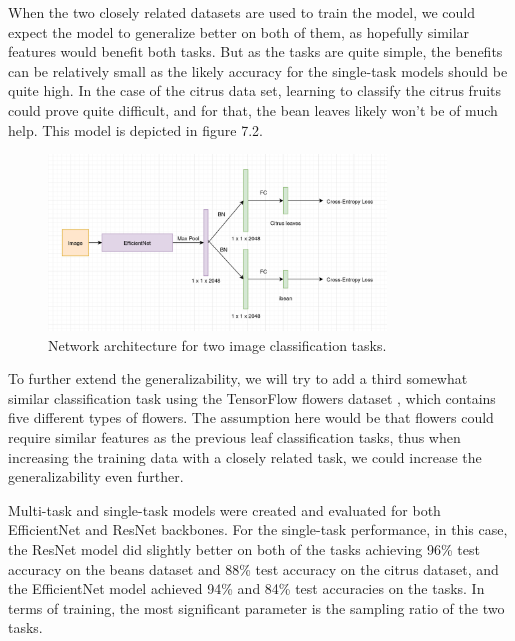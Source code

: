 When the two closely related datasets are used to train the model, we could expect the model to generalize better on both of them, as hopefully similar features would benefit both tasks.
But as the tasks are quite simple, the benefits can be relatively small as the likely accuracy for the single-task models should be quite high.
In the case of the citrus data set, learning to classify the citrus fruits could prove quite difficult, and for that, the bean leaves likely won't be of much help.
This model is depicted in figure 7.2.

\begin{figure}[h!]
    \centering
    \includegraphics[width=0.8\textwidth]{imgs/object_classification_architecture.png}
    \caption{Network architecture for two image classification tasks.}
\end{figure}

To further extend the generalizability, we will try to add a third somewhat similar classification task using the TensorFlow flowers dataset \citep{tfflowers}, which contains five different types of flowers.
The assumption here would be that flowers could require similar features as the previous leaf classification tasks, thus when increasing the training data with a closely related task, we could increase the generalizability even further.

Multi-task and single-task models were created and evaluated for both EfficientNet and ResNet backbones.
For the single-task performance, in this case, the ResNet model did slightly better on both of the tasks achieving 96\% test accuracy on the beans dataset and 88\% test accuracy on the citrus dataset, and the EfficientNet model achieved 94\% and 84\% test accuracies on the tasks.
In terms of training, the most significant parameter is the sampling ratio of the two tasks.

